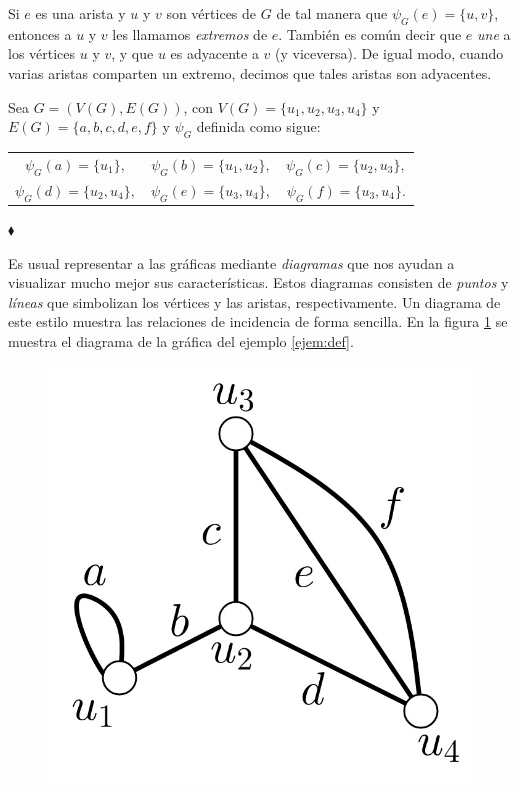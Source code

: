             Si $e$ es una arista y $u$ y $v$ son vértices de $G$ de tal manera que $\psi_{G}(e)=\{u,v\}$, entonces a $u$ y $v$ les llamamos \textit{extremos}  de $e$. También es común decir que $e$ \textit{une} a los vértices $u$ y $v$, y que $u$ es adyacente a $v$ (y viceversa). De igual modo, cuando varias aristas comparten un extremo, decimos que tales aristas son adyacentes.  
 
\begin{ejem} \label{ejem:def}
Sea $G=(V(G),E(G))$, con $V(G)=\{u_{1}, u_{2},u_{3},u_{4}\}$ y $E(G)=\{a,b,c,d,e,f\}$ y $\psi_{G}$ definida como sigue:

\begin{center}
\begin{tabular}{ c c c }
$\psi_{G}(a) = \{u_{1}\},$& $\psi_{G}(b) = \{u_{1},u_{2}\},$ & $\psi_{G}(c) = \{u_{2},u_{3}\},$  \\
$\psi_{G}(d) = \{u_{2},u_{4}\},$  & $\psi_{G}(e) = \{u_{3},u_{4}\},$  & $\psi_{G}(f) = \{u_{3},u_{4}\}.$ 
\end{tabular}
\end{center}

\hfill $\blacklozenge$
\end{ejem}
Es usual representar a las gráficas mediante \textit{diagramas}  que nos ayudan a visualizar mucho mejor sus características. Estos diagramas consisten de \textit{puntos} y \textit{líneas} que simbolizan los vértices y las aristas, respectivamente. Un diagrama de este estilo muestra las relaciones de incidencia de forma sencilla. En la figura \ref{fig:diagrama} se muestra el diagrama de la gráfica del ejemplo \ref{ejem:def}.

\begin{figure}[h]
    \centering
    \includegraphics[scale=0.23]{img/imgchapter1/GrafoDefinicion.jpg}
    \caption{}
    \label{fig:diagrama}
\end{figure}

